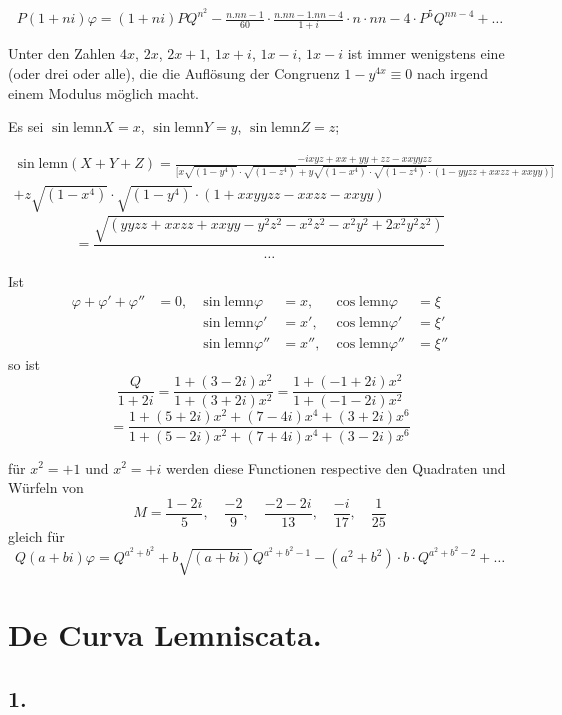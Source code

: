 \documentclass[10pt,a4paper]{article}
\newcommand{\lemn}{\text{lemn}}
\newcommand{\sinlemn}{\sin\lemn}
\newcommand{\coslemn}{\cos\lemn}
\begin{document}
\[
P(1+n i)\varphi = (1+ni)PQ^{n^2} - \tfrac{n.nn-1}{60}\cdot\tfrac{n.nn-1.nn-4}{1+i}\cdot n\cdot nn-4\cdot P^5Q^{nn-4} + \ldots
\]

Unter den Zahlen $4x$, $2x$, $2x+1$, $1x+i$, $1x-i$, $1x-i$ ist immer wenigstens eine (oder drei oder alle), die die Auflösung der Congruenz $1-y^{4x}\equiv 0$
nach irgend einem Modulus möglich macht.

Es sei $\sinlemn X = x$, $\sinlemn Y = y$, $\sinlemn Z = z$;

\begin{multline*}
\sinlemn(X+Y+Z) = \frac{-ixyz + xx+yy+zz-xxyyzz}{\bigl[x\sqrt{(1-y^4)}\cdot\sqrt{(1-z^4)} + y\sqrt{(1-x^4)}\cdot\sqrt{(1-z^4)}\cdot(1-yyzz+xxzz+xxyy)\bigr]}\\
+ z\sqrt{(1-x^4)}\cdot\sqrt{(1-y^4)}\cdot(1+xxyyzz-xxzz-xxyy)
\end{multline*}
\[
= \frac{\sqrt{(yyzz+xxzz+xxyy-y^2z^2-x^2z^2-x^2y^2+2x^2y^2z^2)}}{\ldots}
\]

Ist
\begin{align*}
\varphi + \varphi' + \varphi'' &= 0, & \sinlemn\varphi &= x, & \coslemn\varphi &= \xi\\
&& \sinlemn\varphi' &= x', & \coslemn\varphi' &= \xi'\\
&& \sinlemn\varphi'' &= x'', & \coslemn\varphi'' &= \xi''
\end{align*}
so ist
\[
\frac{Q}{1+2i} = \frac{1+(3-2i)x^2}{1+(3+2i)x^2} = \frac{1+(-1+2i)x^2}{1+(-1-2i)x^2}
\]
\[
= \frac{1+(5+2i)x^2+(7-4i)x^4+(3+2i)x^6}{1+(5-2i)x^2+(7+4i)x^4+(3-2i)x^6}
\]

für $x^2=+1$ und $x^2=+i$ werden diese Functionen respective den Quadraten und Würfeln von
\[
M = \frac{1-2i}{5}, \quad \frac{-2}{9}, \quad \frac{-2-2i}{13}, \quad \frac{-i}{17}, \quad \frac{1}{25}
\]
gleich für
\[
Q(a+bi)\varphi = Q^{a^2+b^2} + b\sqrt{(a+bi)}Q^{a^2+b^2-1} - (a^2+b^2)\cdot b\cdot Q^{a^2+b^2-2} + \ldots
\]


\section*{De Curva Lemniscata.}

\subsection*{1.}
\end{document}

